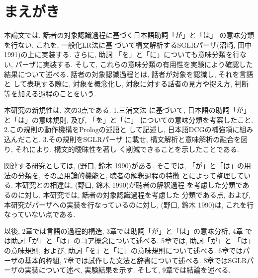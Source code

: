 


\maketitle
\newpage

\section{まえがき}
本論文では, 話者の対象認識過程に基づく日本語助詞「が」と「は」
の意味分類を行ない, これを, 一般化LR法に基
づいて構文解析するSGLRパーザ(沼崎, 田中 1991)の上に実装する. さらに, 助詞
「を」と「に」についても意味分類を行ない, パーザに実装する. 
そして, これらの意味分類の有用性を実験により確認した結果について述べる. 
話者の対象認識過程とは, 話者が対象を認識し, それを言語と
して表現する際に, 対象を概念化し, 対象に対する話者の見方や捉え方, 判断
等を加える過程のことをいう. 

本研究の新規性は, 次の3点である. 1.三浦文法
に基づいて, 日本語の助詞「が」と「は」の意味規則, 及び, 「を」と「に」
についての意味分類を考案したこと. 2.この規則の動作機構をPrologの述語と
して記述し, 日本語DCGの補強項に組み込んだこと. 3.その規則をSGLRパーザ
に載せ, 構文解析と意味解析の融合を図り, それにより, 構文的曖昧性を著し
く削減できることを示したことである. 

関連する研究としては, (野口, 鈴木 1990)がある. そこでは, 
「が」と「は」の用法の分類を, その語用論的機能と, 聴者の解釈過程の特徴
とによって整理している. 本研究との相違は, (野口, 鈴木 1990)が聴者の解釈過程
を考慮した分類であるのに対し, 本研究では, 話者の対象認識過程を考慮した
分類である点, および, 本研究がパーザへの実装を行なっているのに対し, 
(野口, 鈴木 1990)は, これを行なっていない点である. 

以後, 2章では言語の過程的構造, 3章では助詞「が」と「は」の意味分析, 4章
では助詞「が」と「は」のコア概念について述べる. 5章では, 助詞「が」と
「は」の意味規則, および, 助詞「を」と「に」の意味規則について述べる. 
6章ではパーザの基本的枠組, 7章では試作した文法と辞書について述べる. 
8章ではSGLRパーザの実装について述べ, 実験結果を示す. 
そして, 9章では結論を述べる. 

